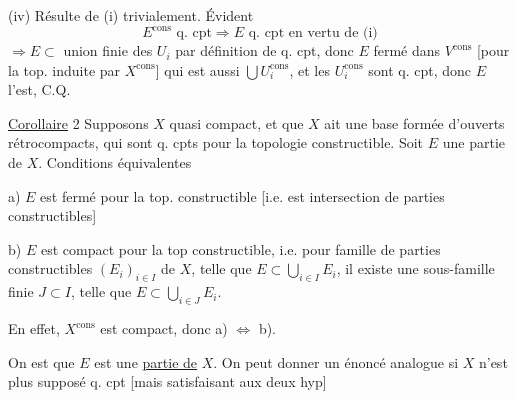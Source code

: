 
(iv) Résulte de (i) trivialement. Évident
\[
E^{\mathrm{cons}}\text{ q. cpt}\Longrightarrow E\text{ q. cpt en vertu de (i)}
\]
$\Longrightarrow E\subset$ union finie  des $U_i$ par définition de q. cpt, donc $E$ fermé dans $V^{\mathrm{cons}}$ [pour la top. induite par $X^{\mathrm{cons}}$] qui est aussi $\bigcup U_i^{\mathrm{cons}}$, et les $U_i^{\mathrm{cons}}$ sont q. cpt, donc $E$ l'est, C.Q.


\uline{Corollaire} 2\quad {} Supposons $X$  quasi compact,  et que  $X$ ait une base formée d'ouverts  rétrocompacts, qui sont q. cpts pour la topologie constructible. Soit $E$ une partie de $X$. Conditions équivalentes

a) $E$ est fermé pour la top. constructible [i.e. est intersection  de parties constructibles]

b) $E$ est compact pour la top constructible, i.e. pour \unsure{$\forall$} famille de parties constructibles $(E_i)_{i\in I}$ de $X$, telle que $E\subset\bigcup_{i\in I}E_i$, il existe une sous-famille finie $J\subset I$, telle que $E\subset\bigcup_{i\in J}E_i$.


 En effet, $X^{\mathrm{cons}}$ est compact, donc a) $\Longleftrightarrow$ b).

On est  que  $E$ est une \uline{partie  de} $X$. On peut donner un énoncé analogue si $X$ n'est plus supposé q. cpt [mais satisfaisant aux deux hyp]


